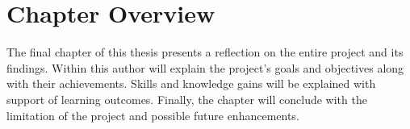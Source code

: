 \section{Chapter Overview}

The final chapter of this thesis presents a reflection on the entire project and its findings. Within this author will explain the project's goals and objectives along with their achievements. Skills and knowledge gains will be explained with support of learning outcomes. Finally, the chapter will conclude with the limitation of the project and possible future enhancements.